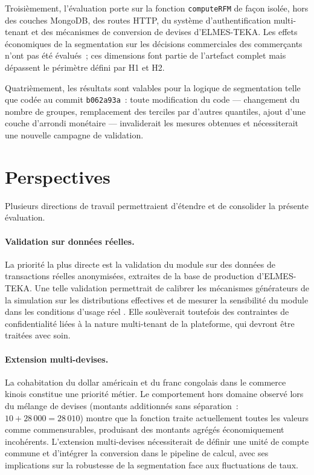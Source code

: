 Troisièmement, l'évaluation porte sur la fonction \texttt{computeRFM} de façon isolée,
hors des couches MongoDB, des routes HTTP, du système d'authentification multi-tenant et
des mécanismes de conversion de devises d'ELMES-TEKA. Les effets économiques de la
segmentation sur les décisions commerciales des commerçants n'ont pas été évalués~; ces
dimensions font partie de l'artefact complet mais dépassent le périmètre défini par H1
et H2.

Quatrièmement, les résultats sont valables pour la logique de segmentation telle que codée
au commit \texttt{b062a93a}~: toute modification du code — changement du nombre de groupes,
remplacement des terciles par d'autres quantiles, ajout d'une couche d'arrondi monétaire —
invaliderait les mesures obtenues et nécessiterait une nouvelle campagne de validation.

\section*{Perspectives}

Plusieurs directions de travail permettraient d'étendre et de consolider la présente
évaluation.

\paragraph{Validation sur données réelles.}
La priorité la plus directe est la validation du module sur des données de transactions
réelles anonymisées, extraites de la base de production d'ELMES-TEKA. Une telle validation
permettrait de calibrer les mécanismes générateurs de la simulation sur les distributions
effectives et de mesurer la sensibilité du module dans les conditions d'usage réel
\citep{Salminen2023}. Elle soulèverait toutefois des contraintes de confidentialité liées
à la nature multi-tenant de la plateforme, qui devront être traitées avec soin.

\paragraph{Extension multi-devises.}
La cohabitation du dollar américain et du franc congolais dans le commerce kinois constitue
une priorité métier. Le comportement hors domaine observé lors du mélange de devises
(montants additionnés sans séparation~: $10 + 28\,000 = 28\,010$) montre que la fonction
traite actuellement toutes les valeurs comme commensurables, produisant des montants agrégés
économiquement incohérents. L'extension multi-devises nécessiterait de définir une unité de
compte commune et d'intégrer la conversion dans le pipeline de calcul, avec ses implications
sur la robustesse de la segmentation face aux fluctuations de taux.

